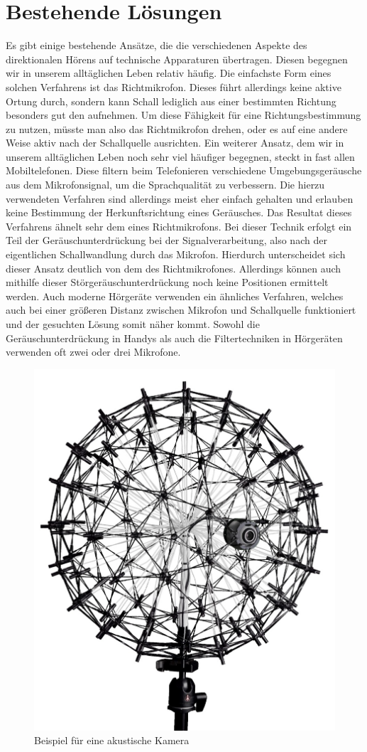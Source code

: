 \section{Bestehende Lösungen}
Es gibt einige bestehende Ansätze, die die verschiedenen Aspekte des direktionalen Hörens auf technische Apparaturen übertragen. Diesen begegnen wir in unserem alltäglichen Leben relativ häufig. Die einfachste Form eines solchen Verfahrens ist das Richtmikrofon. Dieses führt allerdings keine aktive Ortung durch, sondern kann Schall lediglich aus einer bestimmten Richtung besonders gut den aufnehmen. Um diese Fähigkeit für eine Richtungsbestimmung zu nutzen, müsste man also das Richtmikrofon drehen, oder es auf eine andere Weise aktiv nach der Schallquelle ausrichten. Ein weiterer Ansatz, dem wir in unserem alltäglichen Leben noch sehr viel häufiger begegnen, steckt in fast allen Mobiltelefonen. Diese filtern beim Telefonieren verschiedene Umgebungsgeräusche aus dem Mikrofonsignal, um die Sprachqualität zu verbessern. Die hierzu verwendeten Verfahren sind allerdings meist eher einfach gehalten und erlauben keine Bestimmung der Herkunftsrichtung eines Geräusches. Das Resultat dieses Verfahrens ähnelt sehr dem eines Richtmikrofons. Bei dieser Technik erfolgt ein Teil der Geräuschunterdrückung bei der Signalverarbeitung, also nach der eigentlichen Schallwandlung durch das Mikrofon. Hierdurch unterscheidet sich dieser Ansatz deutlich von dem des Richtmikrofones. Allerdings können auch mithilfe dieser Störgeräuschunterdrückung noch keine Positionen ermittelt werden. Auch moderne Hörgeräte verwenden ein ähnliches Verfahren, welches auch bei einer größeren Distanz zwischen Mikrofon und Schallquelle funktioniert und der gesuchten Lösung somit näher kommt. Sowohl die Geräuschunterdrückung in Handys als auch die Filtertechniken in Hörgeräten verwenden oft zwei oder drei Mikrofone.\\
\begin{figure}
    \centering
    \includegraphics[width=0.5\linewidth]{img/akusticCamera}
    \caption{Beispiel für eine akustische Kamera~\cite{camera}\label{fig:camera}}
\end{figure}
